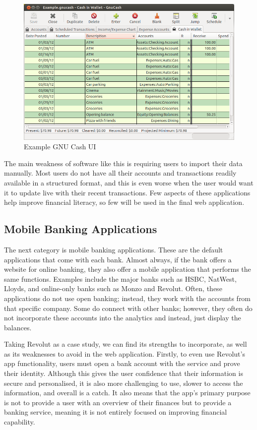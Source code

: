 \begin{figure}[H]
    \centering
    \includegraphics[width=\textwidth]{images/gnucash.png}
    \caption{Example GNU Cash UI \cite{GNUCashUI}}
    \label{fig:gnucash_ui}
\end{figure}

The main weakness of software like this is requiring users to import their data manually. Most users do not have all their accounts and transactions readily available in a structured format, and this is even worse when the user would want it to update live with their recent transactions. Few aspects of these applications help improve financial literacy, so few will be used in the final web application.

\subsection{Mobile Banking Applications}
\label{sec:mobile-banking-applications}
The next category is mobile banking applications. These are the default applications that come with each bank. Almost always, if the bank offers a website for online banking, they also offer a mobile application that performs the same functions. Examples include the major banks such as HSBC, NatWest, Lloyds, and online-only banks such as Monzo and Revolut. Often, these applications do not use open banking; instead, they work with the accounts from that specific company. Some do connect with other banks; however, they often do not incorporate these accounts into the analytics and instead, just display the balances.

Taking Revolut \cite{RevolutWebsite} as a case study, we can find its strengths to incorporate, as well as its weaknesses to avoid in the web application. Firstly, to even use Revolut's app functionality, users must open a bank account with the service and prove their identity. Although this gives the user confidence that their information is secure and personalised, it is also more challenging to use, slower to access the information, and overall is a catch. It also means that the app's primary purpose is not to provide a user with an overview of their finances but to provide a banking service, meaning it is not entirely focused on improving financial capability.

